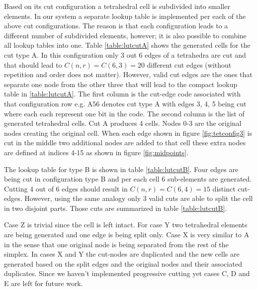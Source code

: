 Based on its cut configuration a tetrahedral cell is subdivided into smaller elements. In our system a separate lookup table is 
implemented per each of the above cut configurations. The reason is that each configuration leads to a different number of subdivided elements, however;
it is also possible to combine all lookup tables into one. Table \ref{table:lutcutA} shows the generated cells for the cut type A.
In this configuration only 3 out 6 edges of a tetrahedra are cut and that should lead to $C(n, r) = C(6, 3) = 20$ different cut edges (without repetition and
order does not matter). However, valid cut edges are the ones that separate one node from the other three that will lead to the compact lookup table in \ref{table:lutcutA}.
The first column is the cut-edge code associated with that configuration row e.g. A56 denotes cut type A with edges 3, 4, 5 being cut where each each represent one bit in 
the code. The second column is the list of generated tetrahedral cells. Cut A produces 4 cells. Nodes 0-3 are the original nodes creating the original cell. When each edge 
shown in figure \ref{fig:tetconfig3} is cut in the middle two additional nodes are added to that cell these extra nodes are defined at indices 4-15 as shown in figure 
\ref{fig:midpoints}.

The lookup table for type B is shown in table \ref{table:lutcutB}. Four edges are being cut in configuration type B and per each cell 6 sub-elements are generated.
Cutting 4 out of 6 edges should result in $C(n, r) = C(6, 4) = 15$ distinct cut-edges. However, using the same analogy only 3 valid cuts are able to split the cell 
in two disjoint parts. Those cuts are summarized in table \ref{table:lutcutB}. 

Case Z is trivial since the cell is left intact. For case Y two tetrahedral elements are being generated and one edge is being split only. Case X is very similar to
A in the sense that one original node is being separated from the rest of the simplex. In cases X and Y the cut-nodes are duplicated and the new cells are generated based
on the split edges and the original nodes and their associated duplicates. Since we haven't implemented progressive cutting yet cases C, D and E are left for future work.

